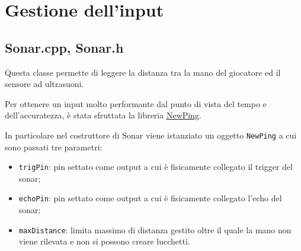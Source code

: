 \section{Gestione dell'input}
\subsection{Sonar.cpp, Sonar.h}
Questa classe permette di leggere la distanza tra la mano del giocatore ed il sensore ad ultrasuoni.

Per ottenere un input molto performante dal punto di vista del tempo e dell'accuratezza, è stata sfruttata la libreria \href{http://playground.arduino.cc/Code/NewPing}{NewPing}.

In particolare nel costruttore di Sonar viene istanziato un oggetto \texttt{NewPing} a cui sono passati tre parametri:
\begin{itemize}
	\item \texttt{trigPin}: pin settato come output a cui è fisicamente collegato il trigger del sonar;
	\item \texttt{echoPin}: pin settato come output a cui è fisicamente collegato l'echo del sonar;
	\item \texttt{maxDistance}: limita massimo di distanza gestito oltre il quale la mano non viene rilevata e non si possono creare lucchetti.
\end{itemize}

